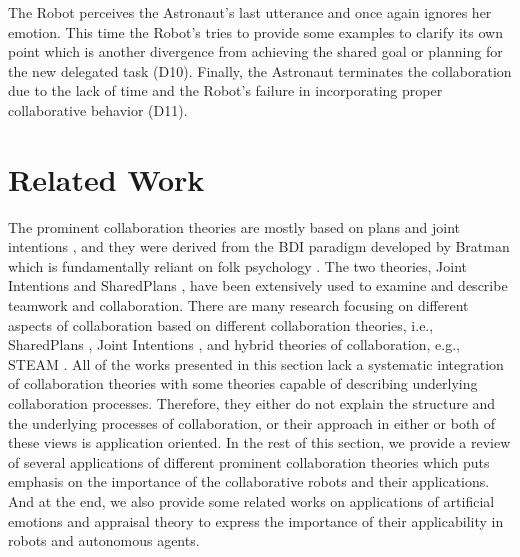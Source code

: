 The Robot perceives the Astronaut's last utterance and once again ignores her
emotion. This time the Robot's tries to provide some examples to clarify its own
point which is another divergence from achieving the shared goal or planning for
the new delegated task (D10). Finally, the Astronaut terminates the
collaboration due to the lack of time and the Robot's failure in incorporating
proper collaborative behavior (D11).\\

\noindent{}

\section{Related Work}
\label{sec:related-work}

The prominent collaboration theories are mostly based on plans and joint
intentions
\cite{cohen:teamwork} \cite{grosz:plans-discourse}, and they were derived from
the BDI paradigm developed by Bratman \cite{bratman:intentions-plans} which is
fundamentally reliant on folk psychology \cite{ravenscroft:folk}. The two
theories, Joint Intentions \cite{cohen:teamwork} and SharedPlans
\cite{grosz:plans-discourse}, have been extensively used to examine and describe
teamwork and collaboration. There are many research focusing on different
aspects of collaboration based on different collaboration theories, i.e.,
SharedPlans
\cite{grosz:planning-acting,grosz:collaboration,grosz:plans-discourse}, Joint
Intentions \cite{cohen:teamwork}, and hybrid theories of collaboration, e.g.,
STEAM \cite{tambe:flexible-teamwork}. All of the works presented in this section
lack a systematic integration of collaboration theories with some theories
capable of describing underlying collaboration processes. Therefore, they either
do not explain the structure and the underlying processes of collaboration, or
their approach in either or both of these views is application oriented. In the
rest of this section, we provide a review of several applications of different
prominent collaboration theories which puts emphasis on the importance of the
collaborative robots and their applications. And at the end, we also provide
some related works on applications of artificial emotions and appraisal theory
to express the importance of their applicability in robots and autonomous
agents.

